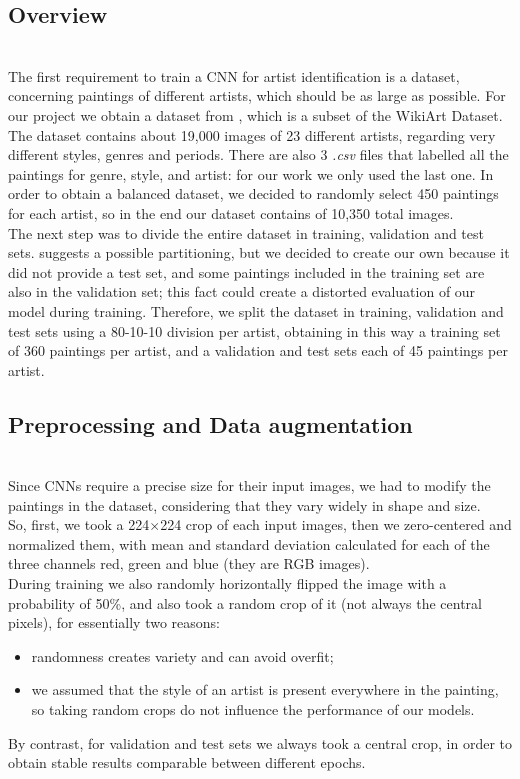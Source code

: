 \documentclass{article}
\begin{document}
\subsection{Overview}\mbox{}\\
The first requirement to train a CNN for artist identification is a dataset, concerning paintings of different artists, which should be as large as possible. For our project we obtain a dataset from \cite{ArtGANDataset}, which is a subset of the WikiArt Dataset. \\
The dataset contains about 19,000 images of 23 different artists, regarding very different styles, genres  and periods. There are also 3 \textit{.csv} files that labelled all the paintings for genre, style, and artist: for our work we only used the last one. In order to obtain a balanced dataset, we decided to randomly select 450 paintings for each artist, so in the end our dataset contains of 10,350 total images. \\
The next step was to divide the entire dataset in training, validation and test sets. \cite{ArtGANDataset} suggests a possible partitioning, but we decided to create our own because it did not provide a test set, and some paintings included in the training set are also in the validation set; this fact could create a distorted evaluation of our model during training. Therefore, we split the dataset in training, validation and test sets using a 80-10-10 division per artist, obtaining in this way a training set of 360 paintings per artist, and a validation and test sets each of 45 paintings per artist.

\subsection{Preprocessing and Data augmentation}\mbox{}\\
Since CNNs require a precise size for their input images, we had to modify the paintings in the dataset, considering that they vary widely in shape and size.\\
So, first, we took a 224$\times$224 crop of each input images, then we zero-centered and normalized them, with mean and standard deviation calculated for each of the three channels red, green and blue (they are RGB images).  \\
During training we also randomly horizontally flipped the image with a probability of 50\%, and also took a random crop of it (not always the central pixels), for essentially two reasons:
\begin{itemize}
	\item randomness creates variety and can avoid overfit;
	\item we assumed that the style of an artist is present everywhere in the painting, so taking random crops do not influence the performance of our models.
\end{itemize}
By contrast, for validation and test sets we always took a central crop, in order to obtain stable results comparable between different epochs.
\end{document}
